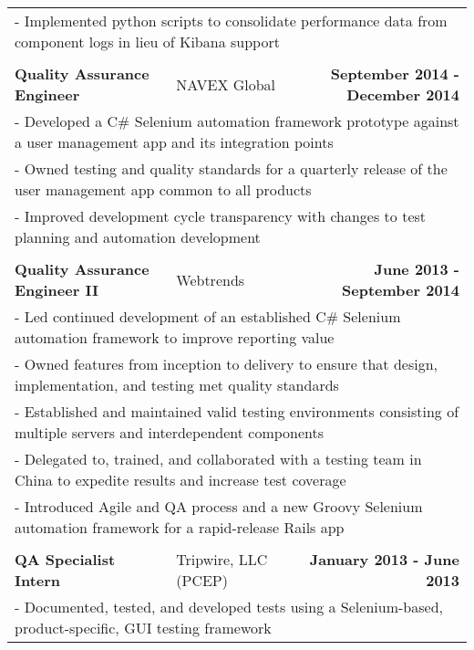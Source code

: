 \documentclass[letterpaper]{article}
\begin{document}
\begin{center}
\begin{tabular}{p{}p{}r}
			\\
				\multicolumn{3}{p{\textwidth}}{\quad\quad - Implemented python scripts to consolidate performance data from component logs in lieu of Kibana support } 
			\\
			\\
				\textbf{Quality Assurance Engineer}									&
				NAVEX Global										&
				\textbf{September 2014 - December 2014}
			\\
				\multicolumn{3}{p{\textwidth}}{\quad\quad - Developed a C\# Selenium automation framework prototype against a user management app and its integration points} 
			\\
				\multicolumn{3}{p{\textwidth}}{\quad\quad - Owned testing and quality standards for a quarterly release of the user management app common to all products} 
			\\
				\multicolumn{3}{p{\textwidth}}{\quad\quad - Improved development cycle transparency with changes to test planning and automation development} 
			\\
			\\
				\textbf{Quality Assurance Engineer II}					&
				Webtrends							&
				\textbf{June 2013 - September 2014}
			\\
				\multicolumn{3}{p{\textwidth}}{\quad\quad - Led continued development of an established C\# Selenium automation framework to improve reporting value}
			\\
				\multicolumn{3}{p{\textwidth}}{\quad\quad - Owned features from inception to delivery to ensure that design, implementation, and testing met quality standards} 
			\\
				\multicolumn{3}{p{\textwidth}}{\quad\quad - Established and maintained valid testing environments consisting of multiple servers and interdependent components} 
			\\
				\multicolumn{3}{p{\textwidth}}{\quad\quad - Delegated to, trained, and collaborated with a testing team in China to expedite results and increase test coverage}
			\\
				\multicolumn{3}{p{\textwidth}}{\quad\quad - Introduced Agile and QA process and a new Groovy Selenium automation framework for a rapid-release Rails app}  
			\\
			\\
				\textbf{QA Specialist Intern}					&
				Tripwire, LLC (PCEP)							&
				\textbf{January 2013 - June 2013}
			\\
				\multicolumn{3}{p{\textwidth}}{\quad\quad - Documented, tested, and developed tests using a Selenium-based, product-specific, GUI testing framework}

\end{tabular}
\end{center}
\end{document}
